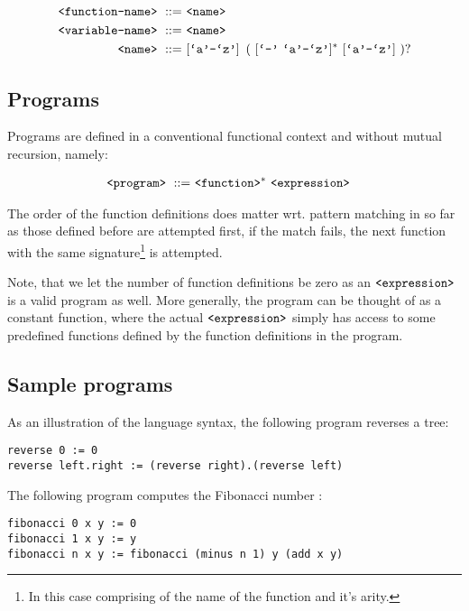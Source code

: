 \begin{align}
\text{{\ttfamily<function-name>}}\ ::=&\ \text{{\ttfamily<name>}}\\
\text{{\ttfamily<variable-name>}}\ ::=&\ \text{{\ttfamily<name>}}\\
\text{{\ttfamily<name>}}\ ::=&\ [\text{{\ttfamily`a'}}\text{{\ttfamily-}}\text{{\ttfamily`z'}}]
\ \left (\ [\text{{\ttfamily`-'}}\ \text{{\ttfamily`a'}}\text{{\ttfamily-}}\text{{\ttfamily`z'}}]^*
\ [\text{{\ttfamily`a'}}\text{{\ttfamily-}}\text{{\ttfamily`z'}}]\ \right )?
\end{align}

\subsection{Programs}

Programs are defined in a conventional functional context and without mutual
recursion, namely:

\begin{align}
\text{{\ttfamily<program>}}\ ::=&\ \text{{\ttfamily<function>}}^*\ \text{{\ttfamily<expression>}}
\end{align}

The order of the function definitions does matter wrt. pattern matching in so
far as those defined before are attempted first, if the match fails, the next
function with the same signature\footnote{In this case comprising of the name
of the function and it's arity.} is attempted.

Note, that we let the number of function definitions be zero as an
$\text{{\ttfamily<expression>}}$ is a valid program as well. More generally, the program
can be thought of as a constant function, where the actual
$\text{{\ttfamily<expression>}}$ simply has access to some predefined functions defined
by the function definitions in the program.

\subsection{Sample programs}

As an illustration of the language syntax, the following program reverses a tree:

\begin{verbatim}
reverse 0 := 0
reverse left.right := (reverse right).(reverse left)
\end{verbatim}

The following program computes the Fibonacci number :

\begin{verbatim}
fibonacci 0 x y := 0
fibonacci 1 x y := y
fibonacci n x y := fibonacci (minus n 1) y (add x y)
\end{verbatim}

